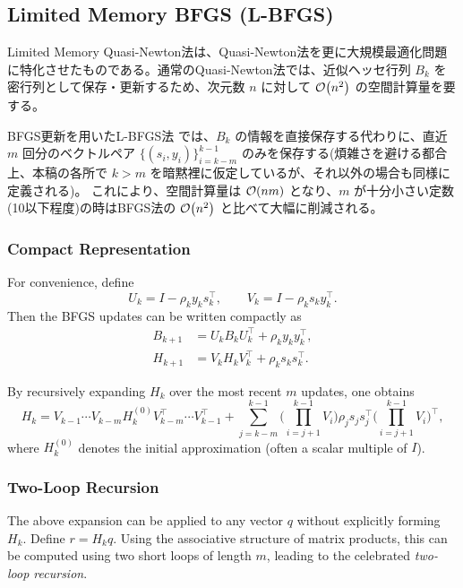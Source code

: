 \documentclass[a4paper, 10pt, dvipdfmx,draft]{article}
\begin{document}
\subsection{ Limited Memory BFGS (L-BFGS) }

Limited Memory Quasi-Newton法は、Quasi-Newton法を更に大規模最適化問題に特化させたものである。通常のQuasi-Newton法では、近似ヘッセ行列 $B_k$ を密行列として保存・更新するため、次元数 $n$ に対して $\order{n^2}$ の空間計算量を要する。

BFGS更新を用いたL-BFGS法 \citep{liuLimitedMemoryBFGS1989a}では、$B_k$ の情報を直接保存する代わりに、直近 $m$ 回分のベクトルペア $\{(s_i,y_i)\}_{i=k-m}^{k-1}$ のみを保存する(煩雑さを避ける都合上、本稿の各所で $k > m$ を暗黙裡に仮定しているが、それ以外の場合も同様に定義される)。 これにより、空間計算量は $\order{nm}$ となり、$m$ が十分小さい定数(10以下程度)の時はBFGS法の $\order{n^2}$ と比べて大幅に削減される。

\subsubsection{Compact Representation}

For convenience, define
\begin{equation}
    U_k = I - \rho_k y_k s_k^\top, \qquad
    V_k = I - \rho_k s_k y_k^\top.
\end{equation}
Then the BFGS updates can be written compactly as
\begin{align}
    B_{k+1} & = U_k B_k U_k^\top + \rho_k y_k y_k^\top, \label{eq:Bk_compact_lbfgs} \\
    H_{k+1} & = V_k H_k V_k^\top + \rho_k s_k s_k^\top. \label{eq:Hk_compact_lbfgs}
\end{align}

By recursively expanding $H_k$ over the most recent $m$ updates, one obtains
\begin{equation}
    H_k
    = V_{k-1} \cdots V_{k-m} H_k^{(0)} V_{k-m}^\top \cdots V_{k-1}^\top
    + \sum_{j=k-m}^{k-1} \bigg( \prod_{i=j+1}^{k-1} V_i \bigg)
    \rho_j s_j s_j^\top
    \bigg( \prod_{i=j+1}^{k-1} V_i \bigg)^\top,
\end{equation}
where $H_k^{(0)}$ denotes the initial approximation (often a scalar multiple of $I$).

\subsubsection{Two-Loop Recursion}

The above expansion can be applied to any vector $q$ without explicitly forming $H_k$.
Define $r = H_k q$.
Using the associative structure of matrix products, this can be computed using two short loops of length $m$,
leading to the celebrated \emph{two-loop recursion}.
\end{document}
